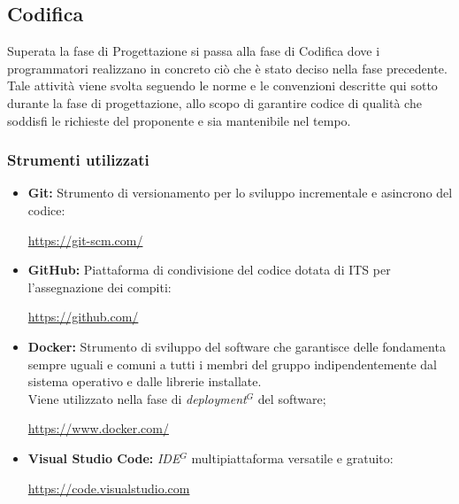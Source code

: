 \subsection{Codifica}
Superata la fase di Progettazione si passa alla fase di Codifica dove i programmatori
realizzano in concreto ciò che è stato deciso nella fase precedente.
Tale attività viene svolta seguendo le norme e le convenzioni descritte qui sotto durante la fase di progettazione, allo
scopo di garantire codice di qualità che soddisfi le richieste del proponente e sia mantenibile nel tempo.

\subsubsection{Strumenti utilizzati}
    \begin{itemize}
    \item \textbf{Git:} Strumento di versionamento per lo sviluppo incrementale e asincrono del codice:
    \begin{center}
      \url{https://git-scm.com/}
    \end{center}
    \item \textbf{GitHub:} Piattaforma di condivisione del codice dotata di ITS per l'assegnazione dei compiti:
    \begin{center}
      \url{https://github.com/}
    \end{center}
    \item \textbf{Docker:} Strumento di sviluppo del software che garantisce delle fondamenta sempre uguali
      e comuni a tutti i membri del gruppo indipendentemente dal sistema operativo e dalle librerie installate. \\
      Viene utilizzato nella fase di \emph{deployment}$^{G}$ del software;
      \begin{center}
        \url{https://www.docker.com/}
      \end{center}
    \item \textbf{Visual Studio Code:} \emph{IDE}$^{G}$ multipiattaforma versatile e gratuito:
    \begin{center}
      \url{https://code.visualstudio.com}
    \end{center}
    \end{itemize}
